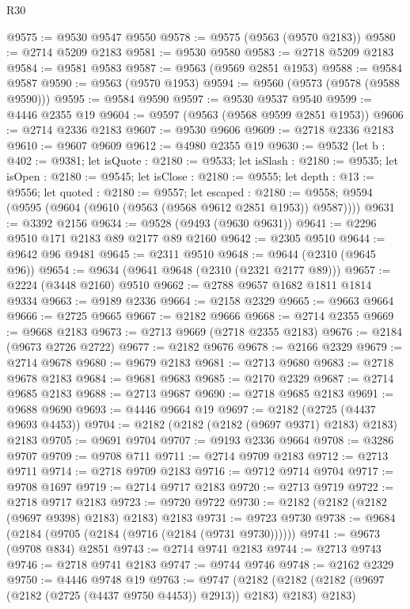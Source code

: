 \begin{lexlean}{R30}
\begin{coremodule}
@9575 := @9530 @9547 @9550
@9578 := @9575 (@9563 (@9570 @2183))
@9580 := @2714 @5209 @2183
@9581 := @9530 @9580
@9583 := @2718 @5209 @2183
@9584 := @9581 @9583
@9587 := @9563 (@9569 @2851 @1953)
@9588 := @9584 @9587
@9590 := @9563 (@9570 @1953)
@9594 := @9560 (@9573 (@9578 (@9588 @9590)))
@9595 := @9584 @9590
@9597 := @9530 @9537 @9540
@9599 := @4446 @2355 @19
@9604 := @9597 (@9563 (@9568 @9599 @2851 @1953))
@9606 := @2714 @2336 @2183
@9607 := @9530 @9606
@9609 := @2718 @2336 @2183
@9610 := @9607 @9609
@9612 := @4980 @2355 @19
@9630 := @9532
    (let b : @402 := @9381;
    let isQuote : @2180 := @9533;
    let isSlash : @2180 := @9535;
    let isOpen : @2180 := @9545;
    let isClose : @2180 := @9555;
    let depth : @13 := @9556;
    let quoted : @2180 := @9557;
    let escaped : @2180 := @9558;
    @9594 (@9595 (@9604 (@9610 (@9563 (@9568 @9612 @2851 @1953)) @9587))))
@9631 := @3392 @2156
@9634 := @9528 (@9493 (@9630 @9631))
@9641 := @2296 @9510 @171 @2183 @89 @2177 @89 @2160
@9642 := @2305 @9510
@9644 := @9642 @96 @9481
@9645 := @2311 @9510
@9648 := @9644 (@2310 (@9645 @96))
@9654 := @9634 (@9641 @9648 (@2310 (@2321 @2177 @89)))
@9657 := @2224 (@3448 @2160) @9510
@9662 := @2788 @9657 @1682 @1811 @1814 @9334
@9663 := @9189 @2336
@9664 := @2158 @2329
@9665 := @9663 @9664
@9666 := @2725 @9665
@9667 := @2182 @9666
@9668 := @2714 @2355
@9669 := @9668 @2183
@9673 := @2713 @9669 (@2718 @2355 @2183)
@9676 := @2184 (@9673 @2726 @2722)
@9677 := @2182 @9676
@9678 := @2166 @2329
@9679 := @2714 @9678
@9680 := @9679 @2183
@9681 := @2713 @9680
@9683 := @2718 @9678 @2183
@9684 := @9681 @9683
@9685 := @2170 @2329
@9687 := @2714 @9685 @2183
@9688 := @2713 @9687
@9690 := @2718 @9685 @2183
@9691 := @9688 @9690
@9693 := @4446 @9664 @19
@9697 := @2182 (@2725 (@4437 @9693 @4453))
@9704 := @2182 (@2182 (@2182 (@9697 @9371) @2183) @2183) @2183
@9705 := @9691 @9704
@9707 := @9193 @2336 @9664
@9708 := @3286 @9707
@9709 := @9708 @711
@9711 := @2714 @9709 @2183
@9712 := @2713 @9711
@9714 := @2718 @9709 @2183
@9716 := @9712 @9714 @9704
@9717 := @9708 @1697
@9719 := @2714 @9717 @2183
@9720 := @2713 @9719
@9722 := @2718 @9717 @2183
@9723 := @9720 @9722
@9730 := @2182 (@2182 (@2182 (@9697 @9398) @2183) @2183) @2183
@9731 := @9723 @9730
@9738 := @9684 (@2184 (@9705 (@2184 (@9716 (@2184 (@9731 @9730))))))
@9741 := @9673 (@9708 @834) @2851
@9743 := @2714 @9741 @2183
@9744 := @2713 @9743
@9746 := @2718 @9741 @2183
@9747 := @9744 @9746
@9748 := @2162 @2329
@9750 := @4446 @9748 @19
@9763 := @9747
    (@2182 (@2182 (@2182 (@9697 (@2182 (@2725 (@4437 @9750 @4453)) @2913)) @2183) @2183) @2183)

\end{coremodule}
\end{lexlean}
